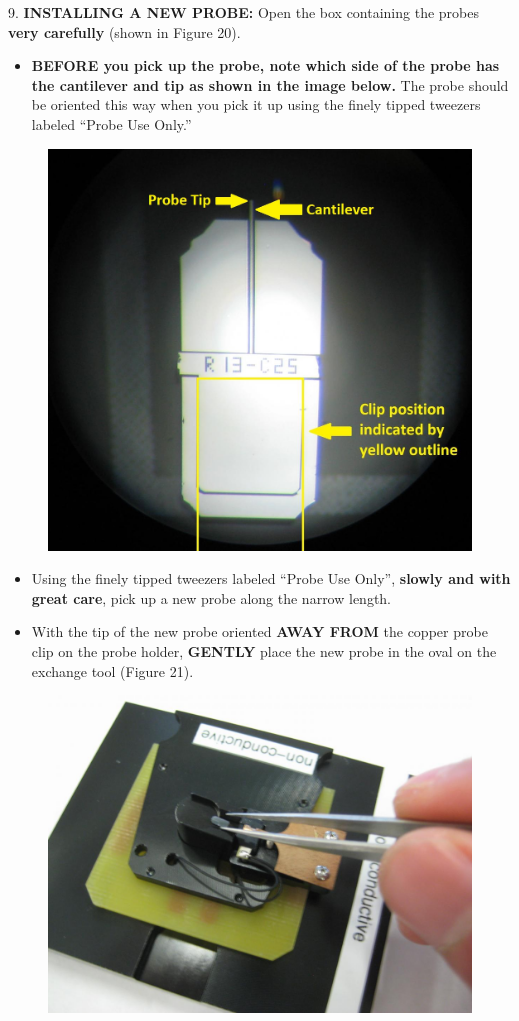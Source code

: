 \documentclass{../lab}
\begin{document}
9.  \textbf{INSTALLING A NEW PROBE:}  Open the box containing the probes\textbf{ very carefully} (shown in Figure 20).

\begin{itemize}
    \item \textbf{BEFORE you pick up the probe, note which side of the probe has the cantilever and tip as shown in the image below.}  The probe should be oriented this way when you pick it up using the finely tipped tweezers labeled ``Probe Use Only.''

\end{itemize}


\begin{figure}[h]
    \centering
    \href{http://dev-physicsadv.pantheon.berkeley.edu/sites/default/files/AFMImages/AFMprobe.JPG}{\includegraphics[width=0.5\linewidth]{images/AFMprobe.JPG}}
    \caption{}
    \label{fig:AFMprobe}
\end{figure}

\begin{itemize}
    \item Using the finely tipped tweezers labeled ``Probe Use Only'', \textbf{slowly and with great care}, pick up a new probe along the narrow length.

    \item With the tip of the new probe oriented \textbf{AWAY FROM}\textbf{ }the copper probe clip on the probe holder, \textbf{GENTLY} place the new probe in the oval on the exchange tool (Figure 21).

\end{itemize}


\begin{figure}[h]
    \centering
    \href{http://dev-physicsadv.pantheon.berkeley.edu/sites/default/files/AFMImages/21.JPG}{\includegraphics[width=0.5\linewidth]{images/21.JPG}}
    \caption{}
    \label{fig:21}
\end{figure}
\end{document}
